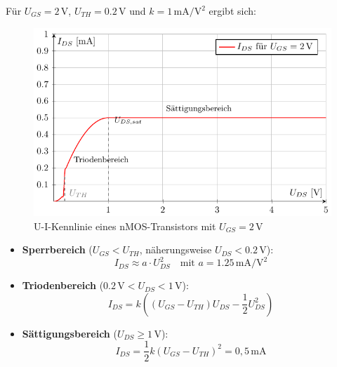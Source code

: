 \documentclass{scrarticle}
\numberwithin{equation}{section}
\begin{document}
Für \( U_{GS} = 2\,\mathrm{V} \), \( U_{TH} = 0.2\,\mathrm{V} \) und \( k = 1\,\mathrm{mA/V^2} \) ergibt sich:
\begin{figure}[h]
	\centering
	\label{fig:kennlinie}
	\includegraphics[scale=1.0]{tkiz/ui-kennlinie.pdf}
	\caption{U-I-Kennlinie eines nMOS-Transistors mit $U_{GS} = 2\,\mathrm{V}$}
\end{figure}
\begin{itemize}
	\item \textbf{Sperrbereich} ($U_{GS} < U_{TH}$, näherungsweise $U_{DS} < 0.2\,\mathrm{V}$): \\
	\[
	I_{DS} \approx a \cdot U_{DS}^2 \quad \text{mit } a = 1.25\,\mathrm{mA/V^2}
	\]
	\item \textbf{Triodenbereich} ($0.2\,\mathrm{V} < U_{DS} < 1\,\mathrm{V}$): \\
	\[
	I_{DS} = k \left((U_{GS} - U_{TH}) U_{DS} - \frac{1}{2} U_{DS}^2\right)
	\]
	\item \textbf{Sättigungsbereich} ($U_{DS} \ge 1\,\mathrm{V}$): \\
	\[
	I_{DS} = \frac{1}{2} k (U_{GS} - U_{TH})^2 = 0{,}5\,\mathrm{mA}
	\]
\end{itemize}
\end{document}
